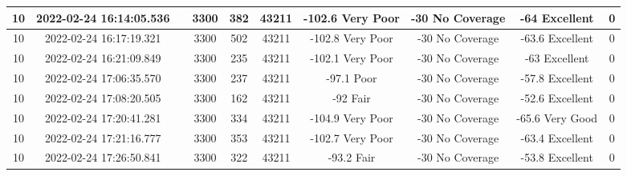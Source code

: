 \begin{longtable*}{|c|c|c|c|c|c|c|c|c|c|}
10&2022-02-24 16:14:05.536&&3300&382&43211& -102.6    Very Poor   & -30       No Coverage & -64       Excellent   & 0\\\hline
{}10&2022-02-24 16:17:19.321&&3300&502&43211& -102.8    Very Poor   & -30       No Coverage & -63.6     Excellent   & 0\\\hline
{}10&2022-02-24 16:21:09.849&&3300&235&43211& -102.1    Very Poor   & -30       No Coverage & -63       Excellent   & 0\\\hline
{}10&2022-02-24 17:06:35.570&&3300&237&43211& -97.1     Poor        & -30       No Coverage & -57.8     Excellent   & 0\\\hline
{}10&2022-02-24 17:08:20.505&&3300&162&43211& -92       Fair        & -30       No Coverage & -52.6     Excellent   & 0\\\hline
{}10&2022-02-24 17:20:41.281&&3300&334&43211& -104.9    Very Poor   & -30       No Coverage & -65.6     Very Good   & 0\\\hline
{}10&2022-02-24 17:21:16.777&&3300&353&43211& -102.7    Very Poor   & -30       No Coverage & -63.4     Excellent   & 0\\\hline
{}10&2022-02-24 17:26:50.841&&3300&322&43211& -93.2     Fair        & -30       No Coverage & -53.8     Excellent   & 0\\\hline

\end{longtable*}

